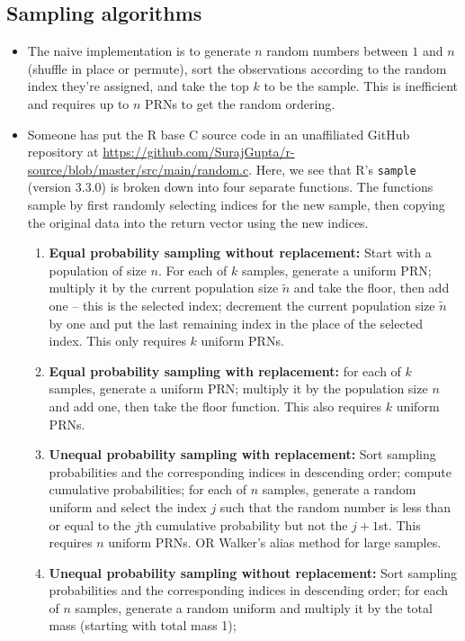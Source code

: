 \documentclass[12pt]{article}
\begin{document}
\subsection{Sampling algorithms}
\begin{itemize}
\item The naive implementation is to generate $n$ random numbers between $1$ and $n$ (shuffle in place or permute),
sort the observations according to the random index they're assigned,
and take the top $k$ to be the sample.
This is inefficient and requires up to $n$ PRNs to get the random ordering.
\item Someone has put the R base C source code in an unaffiliated GitHub repository at \url{https://github.com/SurajGupta/r-source/blob/master/src/main/random.c}.
Here, we see that R's \texttt{sample} (version 3.3.0) is broken down into four separate functions.
The functions sample by first randomly selecting indices for the new sample, then copying the original data into the return vector using the new indices.
\begin{enumerate}
\item \textbf{Equal probability sampling without replacement:} 
Start with a population of size $n$.
For each of $k$ samples, generate a uniform PRN;
multiply it by the current population size $\tilde{n}$ and take the floor, then add one -- this is the selected index;
decrement the current population size $\tilde{n}$ by one and put the last remaining index in the place of the selected index.
This only requires $k$ uniform PRNs.
\item \textbf{Equal probability sampling with replacement:} 
for each of $k$ samples, generate a uniform PRN;
multiply it by the population size $n$ and add one, then take the floor function.
This also requires $k$ uniform PRNs.
\item \textbf{Unequal probability sampling with replacement:} 
Sort sampling probabilities and the corresponding indices in descending order; 
compute cumulative probabilities; 
for each of $n$ samples, generate a random uniform and select the index $j$ such that the random number is less than or equal to the $j$th cumulative probability but not the $j+1$st.  
This requires $n$ uniform PRNs.  
OR Walker's alias method for large samples.
\item \textbf{Unequal probability sampling without replacement:} 
Sort sampling probabilities and the corresponding indices in descending order; 
for each of $n$ samples, generate a random uniform and multiply it by the total mass (starting with total mass 1);

\end{enumerate}
\end{itemize}
\end{document}
